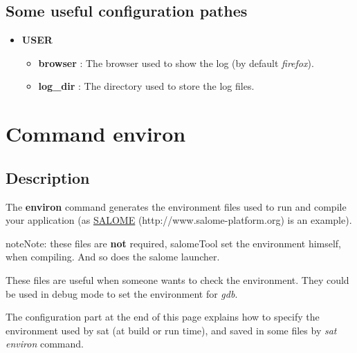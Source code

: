 \documentclass[a4paper,10pt,english]{sphinxmanual}
\begin{document}
\subsection{Some useful configuration pathes}
\label{commands/log:some-useful-configuration-pathes}\begin{itemize}
\item {} 
\textbf{USER}
\begin{itemize}
\item {} 
\textbf{browser} : The browser used to show the log (by default \emph{firefox}).

\item {} 
\textbf{log\_dir} : The directory used to store the log files.

\end{itemize}

\end{itemize}


\section{Command environ}
\label{commands/environ:svn}\label{commands/environ:command-environ}\label{commands/environ::doc}

\subsection{Description}
\label{commands/environ:description}
The \textbf{environ} command generates the environment files used
to run and compile your application (as \href{http://www.salome-platform.org}{SALOME} (http://www.salome-platform.org) is an example).

\begin{notice}{note}{Note:}
these files are \textbf{not} required,
salomeTool set the environment himself, when compiling.
And so does the salome launcher.

These files are useful when someone wants to check the environment.
They could be used in debug mode to set the environment for \emph{gdb}.
\end{notice}

The configuration part at the end of this page explains how
to specify the environment used by sat (at build or run time),
and saved in some files by \emph{sat environ} command.
\end{document}

